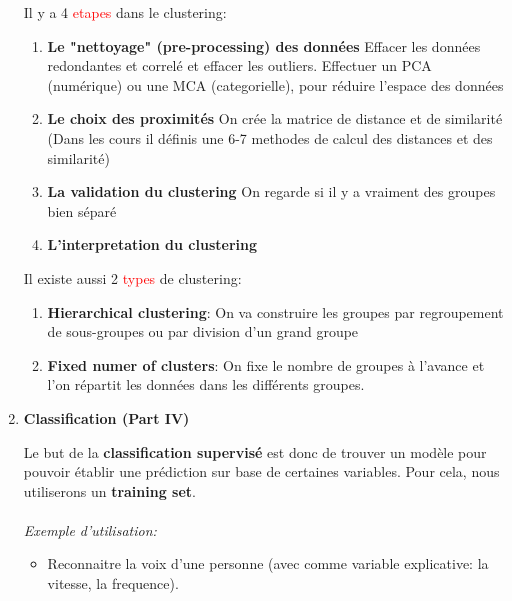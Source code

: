 \documentclass[a4paper, 11pt, onecolumn]{article}
\begin{document}
\begin{enumerate}
  \begin{description}
  \end{description}


  Il y a 4 \textcolor{red}{etapes} dans le clustering:
\begin{enumerate}
\item \textbf{Le "nettoyage" (pre-processing) des données}
Effacer les données redondantes et correlé et effacer les outliers.
Effectuer un PCA (numérique) ou une MCA (categorielle), pour réduire l'espace des données
\item \textbf{Le choix des proximités}
On crée la matrice de distance et de similarité (Dans les cours il définis une 6-7 methodes de calcul des distances et des similarité)
\item \textbf{La validation du clustering} On regarde si il y a vraiment des groupes bien séparé
\item \textbf{L'interpretation du clustering}
\end{enumerate}

Il existe aussi 2 \textcolor{red}{types} de clustering:
\begin{enumerate}
\item \textbf{Hierarchical clustering}: On va construire les groupes par regroupement de sous-groupes ou par division d'un grand groupe
\item \textbf{Fixed numer of clusters}: On fixe le nombre de groupes à l'avance et l'on répartit les données dans les différents groupes.
\end{enumerate}

\item \textbf{Classification (Part IV)}

Le but de la \textbf{classification supervisé} est donc de trouver un modèle pour pouvoir établir une prédiction sur base de certaines variables. Pour cela, nous utiliserons un \textbf{training set}.

\paragraph{}\textit{Exemple d'utilisation:}
\begin{itemize}
\item Reconnaitre la voix d'une personne (avec comme variable
explicative: la vitesse, la frequence).


\end{itemize}
\end{enumerate}
\end{document}
